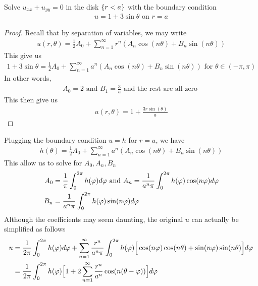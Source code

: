 \documentclass{report}
\begin{document}
\begin{question}{}{}
Solve $u_{xx}+u_{yy}=0$ in the disk $\{ r<a \}$ with the boundary condition 
\begin{align*}
u=1+3 \sin \theta \text{ on }r=a
\end{align*}
\end{question}
\begin{proof}
Recall that by separation of variables, we may write 
\begin{align*}
u(r, \theta)= \frac{1}{2}A_0 + \sum_{n=1}^{\infty} r^n (A_n \cos ( n\theta)+ B_n \sin (n \theta))
\end{align*}
This give us 
\begin{align*}
1+3 \sin \theta = \frac{1}{2}A_0+ \sum_{n=1}^{\infty}a^n (A_n \cos ( n\theta)+ B_n \sin ( n\theta))\text{ for }\theta \in (-\pi ,\pi )
\end{align*}
In other words, 
\begin{align*}
A_0=2 \text{ and } B_1= \frac{3}{a}\text{ and the rest are all zero }
\end{align*}
This then give us 
\begin{align*}
u(r,\theta)= 1+ \frac{3r \sin (\theta)}{a}
\end{align*}
\end{proof}
\begin{mdframed}

Plugging the boundary condition $u=h$ for  $r=a$, we have 
 \begin{align*}
h(\theta) = \frac{1}{2}A_0 + \sum_{n=1}^{\infty} a^n (A_n \cos (n \theta)+ B_n \sin (n \theta))
\end{align*}
This allow us to solve for $A_0,A_n,B_n$
\begin{align*}
A_0&= \frac{1}{\pi }\int_0^{2\pi } h(\pfi)d \pfi \text{ and } A_n= \frac{1}{a^n \pi }\int_0^{2\pi }h(\pfi) \cos (n \pfi)d \pfi  \\
B_n&= \frac{1}{a^n \pi}\int_{0}^{2\pi } h(\pfi)\sin (n \pfi)d\phi
\end{align*}
Although the coefficients may seem daunting, the original $u$ can actually be simplified as follows 
\begin{align*}
u&= \frac{1}{2\pi }\int_0^{2\pi }h(\pfi)d\phi + \sum_{n=1}^{\infty} \frac{r^n}{a^n \pi }\int_0^{2\pi } h(\pfi) \Big[\cos (n \pfi)\cos (n \theta)+ \sin (n \pfi)\sin (n \theta) \Big] d\pfi  \\
&=\frac{1}{2\pi } \int_0^{2\pi }h(\phi)\Big[1+ 2\sum_{n=1}^{\infty} \frac{r^n}{a^n}\cos (n(\theta- \pfi)) \Big]d \pfi
\end{align*}
\end{mdframed}
\end{document}
